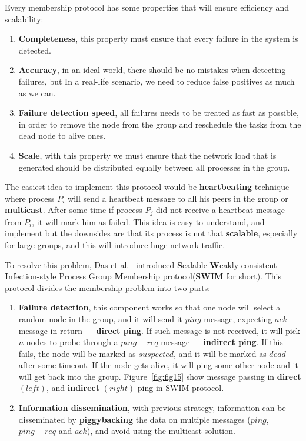 Every membership protocol has some properties that will ensure efficiency and scalability:

\begin{enumerate}[start=1,label={(\bfseries \arabic*)}] \label{ds:features}
	\item \textbf{Completeness}, this property must ensure that every failure in the system is detected.
	\item \textbf{Accuracy}, in an ideal world, there should be no mistakes when detecting failures, but In a real-life scenario, we need to reduce false positives as much as we can.
	\item \textbf{Failure detection speed}, all failures needs to be treated as fast as possible, in order to remove the node from the group and reschedule the tasks from the dead node to alive ones.
	\item \textbf{Scale}, with this property we must ensure that the network load that is generated should be distributed equally between all processes in the group.
\end{enumerate}

\noindent
The easiest idea to implement this protocol would be \textbf{heartbeating} technique where process $P_i$ will send a heartbeat message to all his peers in the group or \textbf{multicast}. After some time if process $P_j$ did not receive a heartbeat message from $P_i$, it will mark him as failed. This idea is easy to understand, and implement but the downsides are that its process is not that \textbf{scalable}, especially for large groups, and this will introduce huge network traffic.

To resolve this problem, Das et al.~\cite{DasGM02} introduced \textbf{S}calable \textbf{W}eakly-consistent \textbf{I}nfection-style Process Group \textbf{M}embership protocol\newline (\textbf{SWIM} for short)\label{swim}. 
\noindent
This protocol divides the membership problem into two parts:

\begin{enumerate}[start=1,label={(\bfseries \arabic*)}]
	\item \textbf{Failure detection}, this component works so that one node will select a random node in the group, and it will send it $ping$ message, expecting $ack$ message in return --- \textbf{direct ping}. If such message is not received, it will pick $n$ nodes to probe through a $ping-req$ message --- \textbf{indirect ping}. If this fails, the node will be marked as $suspected$, and it will be marked as $dead$ after some timeout. If the node gets alive, it will ping some other node and it will get back into the group. Figure~\ref{fig:fig15} show message passing in \textbf{direct} $(left)$, and \textbf{indirect} $(right)$ ping in SWIM protocol.
	\item \textbf{Information dissemination}, with previous strategy, information can be disseminated by \textbf{piggybacking} the data on multiple messages ($ping$, $ping-req$ and $ack$), and avoid using the multicast solution.
\end{enumerate}

